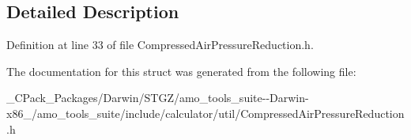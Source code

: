 \subsection{Detailed Description}


Definition at line 33 of file Compressed\+Air\+Pressure\+Reduction.\+h.



The documentation for this struct was generated from the following file\+:\begin{DoxyCompactItemize}
\item 
\+\_\+\+C\+Pack\+\_\+\+Packages/\+Darwin/\+S\+T\+G\+Z/amo\+\_\+tools\+\_\+suite-\/-\/\+Darwin-\/x86\+\_/amo\+\_\+tools\+\_\+suite/include/calculator/util/Compressed\+Air\+Pressure\+Reduction.\+h\end{DoxyCompactItemize}
